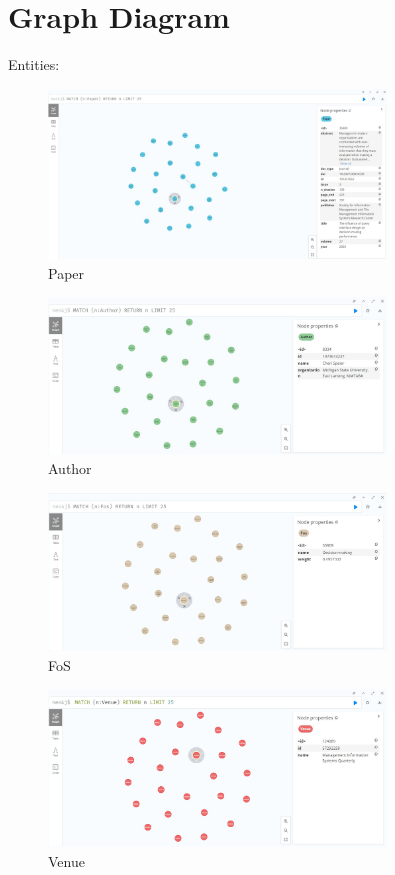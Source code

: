 \documentclass{Configuration_Files/PoliMi3i_thesis}
\begin{document}
\section{Graph Diagram}
Entities:
 \begin{figure}[H]
    \centering
     \includegraphics[width=0.8\textwidth]{Images/data/Paper.jpg}
    \caption{Paper}
    \label{fig:quadtree}
\end{figure}
    \begin{figure}[H]
    \centering
    \includegraphics[width=0.8\textwidth]{Images/data/Author.jpg}
    \caption{Author}
    \label{fig:quadtree}
\end{figure}
\begin{figure}[H]
    \centering
    \includegraphics[width=0.8\textwidth]{Images/data/Fos.jpg}
    \caption{FoS}
    \label{fig:quadtree}
\end{figure}
\begin{figure}[H]
    \centering
    \includegraphics[width=0.8\textwidth]{Images/data/Venue.jpg}
    \caption{Venue}
    \label{fig:quadtree}
\end{figure}
  
\end{document}

